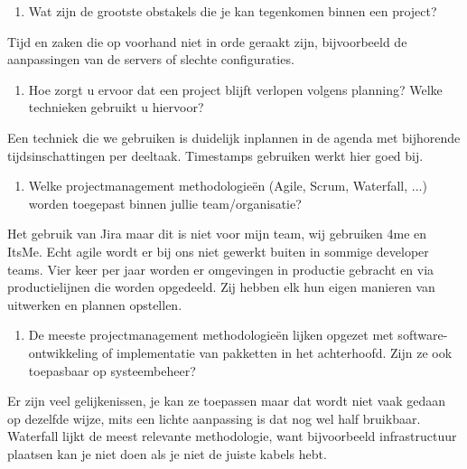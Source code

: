 \documentclass{hogent-article}
\begin{document}
    \begin{enumerate}[resume]\bfseries
        \item Wat zijn de grootste obstakels die je kan tegenkomen binnen een project?  
    \end{enumerate}

    Tijd en zaken die op voorhand niet in orde geraakt zijn, bijvoorbeeld de aanpassingen van de servers of slechte configuraties.\\
    
    \begin{enumerate}[resume]\bfseries
        \item Hoe zorgt u ervoor dat een project blijft verlopen volgens planning? Welke technieken gebruikt u hiervoor? 
    \end{enumerate}

     Een techniek die we gebruiken is duidelijk inplannen in de agenda met bijhorende tijdsinschattingen per deeltaak. Timestamps gebruiken werkt hier goed bij.\\
     
     \begin{enumerate}[resume]\bfseries
         \item Welke projectmanagement methodologieën (Agile, Scrum, Waterfall, ...) worden toegepast binnen jullie team/organisatie? 
     \end{enumerate}
 
    Het gebruik van Jira maar dit is niet voor mijn team, wij gebruiken 4me en ItsMe. Echt agile wordt er bij ons niet gewerkt buiten in sommige developer teams. Vier keer per jaar worden er omgevingen in productie gebracht en via productielijnen die worden opgedeeld. Zij hebben elk hun eigen manieren van uitwerken en plannen opstellen.\\
    
     \begin{enumerate}[resume]\bfseries
         \item De meeste projectmanagement methodologieën lijken opgezet met software-ontwikkeling of implementatie van pakketten in het achterhoofd. Zijn ze ook toepasbaar op systeembeheer? 
     \end{enumerate}
    
    Er zijn veel gelijkenissen, je kan ze toepassen maar dat wordt niet vaak gedaan op dezelfde wijze, mits een lichte aanpassing is dat nog wel half bruikbaar. Waterfall lijkt de meest relevante methodologie, want bijvoorbeeld infrastructuur plaatsen kan je niet doen als je niet de juiste kabels hebt.\\
    
\end{document}
